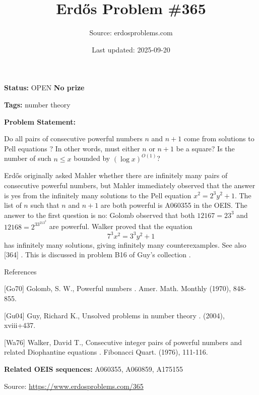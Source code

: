 \documentclass{article}
\title{Erd\H{o}s Problem \#365}
\date{Last updated: 2025-09-20}
\author{Source: erdosproblems.com}
\begin{document}
\maketitle

\noindent\textbf{Status:} OPEN \quad \textbf{No prize}

\noindent\textbf{Tags:} number theory

\medskip

\noindent\textbf{Problem Statement:}

Do all pairs of consecutive powerful numbers $n$ and $n+1$ come from solutions to Pell equations ? In other words, must either $n$ or $n+1$ be a square? Is the number of such $n\leq x$ bounded by $(\log x)^{O(1)}$?




Erd\H{o}s originally asked Mahler whether there are infinitely many pairs of consecutive powerful numbers, but Mahler immediately observed that the answer is yes from the infinitely many solutions to the Pell equation $x^2=2^3y^2+1$. The list of $n$ such that $n$ and $n+1$ are both powerful is A060355 in the OEIS. The answer to the first question is no: Golomb \cite{Go70} observed that both $12167=23^3$ and $12168=2^33^213^2$ are powerful. Walker \cite{Wa76} proved that the equation\[7^3x^2=3^3y^2+1\]has infinitely many solutions, giving infinitely many counterexamples. See also [364] . This is discussed in problem B16 of Guy's collection \cite{Gu04}.




References

[Go70] Golomb, S. W., Powerful numbers . Amer. Math. Monthly (1970), 848-855.

[Gu04] Guy, Richard K., Unsolved problems in number theory . (2004), xviii+437.

[Wa76] Walker, David T., Consecutive integer pairs of powerful numbers and related Diophantine equations . Fibonacci Quart. (1976), 111-116.

\noindent\textbf{Related OEIS sequences:} A060355, A060859, A175155


\bigskip
\noindent\small{Source: \url{https://www.erdosproblems.com/365}}
\end{document}
